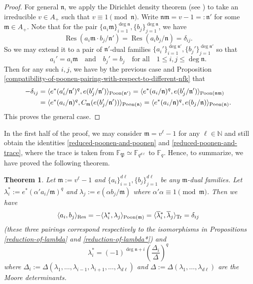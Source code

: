 \documentclass[11pt]{amsart}
\theoremstyle{plain}
\newtheorem{thm}{Theorem}[subsection]
\theoremstyle{definition}
\theoremstyle{remark}
\numberwithin{equation}{section}
\newcommand{\NN}{\mathbb{N}}
\newcommand{\FF}{\mathbb{F}}
\newcommand{\mfk}{\mathfrak{m}}
\newcommand{\nfk}{\mathfrak{n}}
\newcommand{\Pfk}{\mathfrak{P}}
\newcommand{\Res}{\operatorname{Res}}
\newcommand{\ovl}{\overline}
\newcommand{\ang}[1]{\langle #1 \rangle}
\newcommand{\Fq}{\FF_q}
\newcommand{\Fqdl}{\FF_{q^{d\l}}}
\let\l\ell
\DeclarePairedDelimiter{\angres}{\langle}{\rangle_{\textnormal{Res}}}
\DeclarePairedDelimiter{\angtr}{\langle}{\rangle_\textnormal{Tr}}
\begin{document}
\begin{proof}
		For general $\nfk$, we apply the Dirichlet density theorem (see \cite[Chapter 4]{rosen2002number}) to take an irreducible $v \in A_+$ such that $v \equiv 1 \pmod{\nfk}$.
		Write $\nfk\mfk = v - 1 =: \nfk'$ for some $\mfk \in A_+$.
		Note that for the pair $\{a_i\mfk\}_{i=1}^{\deg\nfk}, \{b_j\}_{j=1}^{\deg\nfk}$, we have
		$$
		\Res(a_i\mfk \cdot b_j / \nfk') = \Res(a_ib_j/\nfk) = \delta_{ij}.
		$$
		So we may extend it to a pair of $\nfk'$-dual families $\{a_i'\}_{i=1}^{\deg\nfk'}, \{b_j'\}_{j=1}^{\deg\nfk'}$ so that
		$$
		a_i' = a_i\mfk
		\quad
		\text{and}
		\quad
		b_j' = b_j
		\quad
		\text{for all}
		\quad
		1\leq i,j \leq \deg\nfk.
		$$
		Then for any such $i,j$, we have by the previous case and Proposition \ref{compatibility-of-poonen-pairing-with-respect-to-different-nfk} that
		\begin{align*}
			-\delta_{ij}
			&= \ang{e^*(a_i'/\nfk')^q,e(b_j'/\nfk')}_{\textnormal{Poon}(\nfk')}
			= \ang{e^*(a_i/\nfk)^q,e(b_j'/\nfk')}_{\textnormal{Poon}(\nfk\mfk)}    \\
			&= \ang{e^*(a_i/\nfk)^q,C_\mfk(e(b_j'/\nfk'))}_{\textnormal{Poon}(\nfk)}
			= \ang{e^*(a_i/\nfk)^q, e(b_j/\nfk)}_{\textnormal{Poon}(\nfk)}.
		\end{align*}
		This proves the general case.
	\end{proof}
	
	In the first half of the proof, we may consider $\mfk = v^\l - 1$ for any $\l \in \NN$ and still obtain the identities \eqref{reduced-poonen-and-poonen} and \eqref{reduced-poonen-and-trace}, where the trace is taken from $\FF_{\Pfk} \simeq \Fqdl$ to $\Fq$.
	Hence, to summarize, we have proved the following theorem.
	
	\begin{thm}    \label{pairing-summary}
		Let $\mfk := v^\l-1$ and $\{a_i\}_{i=1}^{d\l}, \{b_j\}_{j=1}^{d\l}$ be any $\mfk$-dual families.
		Let $\lambda_i^* := e^*(\alpha' a_i/\mfk)^q$ and $\lambda_j := e(\alpha b_j/\mfk)$ where $\alpha'\alpha \equiv 1 \pmod{\mfk}$.
		Then we have
		$$
		\angres{a_i,b_j}
		= - \ang{\lambda_i^*,\lambda_j}_{\textnormal{Poon}(\mfk)}
		= \angtr{\ovl{\lambda}{}^*_i,\ovl{\lambda}_j}
		= \delta_{ij}
		$$
		(these three pairings correspond respectively to the isomorphisms in Propositions \ref{reduction-of-lambda} and \ref{reduction-of-lambda*})
		and
		$$
		\lambda_i^* = (-1)^{\deg\nfk+i} \left(\frac{\Delta_i}{\Delta}\right)^q
		$$
		where $\Delta_i := \Delta(\lambda_1,\ldots,\lambda_{i-1},\lambda_{i+1},\ldots,\lambda_{d\l})$ and $\Delta := \Delta(\lambda_1,\ldots,\lambda_{d\l})$ are the Moore determinants.
	\end{thm}
	
\end{document}
